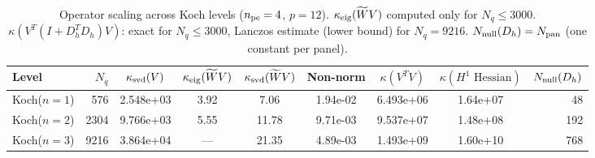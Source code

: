 \begin{table}[ht]
\centering
\caption{Operator scaling across Koch levels ($n_{\rm pe}=4$, $p=12$). $\kappa_{\rm eig}(\widetilde{W}V)$ computed only for $N_q\leq 3000$. $\kappa(V^T(I+D_h^TD_h)V)$: exact for $N_q\leq 3000$, Lanczos estimate (lower bound) for $N_q=9216$. $N_{\rm null}(D_h) = N_{\rm pan}$ (one constant per panel).}
\label{tab:operator_scaling}
\begin{tabular}{@{}lrccccccr@{}}
\toprule
Level & $N_q$ & $\kappa_{\rm svd}(V)$ & $\kappa_{\rm eig}(\widetilde{W}V)$ & $\kappa_{\rm svd}(\widetilde{W}V)$ & Non-norm & $\kappa(V^TV)$ & $\kappa(H^1\text{ Hessian})$ & $N_{\rm null}(D_h)$ \\
\midrule
  Koch($n=1$) & 576 & 2.548e+03 & 3.92 & 7.06 & 1.94e-02 & 6.493e+06 & 1.64e+07 & 48 \\
  Koch($n=2$) & 2304 & 9.766e+03 & 5.55 & 11.78 & 9.71e-03 & 9.537e+07 & 1.48e+08 & 192 \\
  Koch($n=3$) & 9216 & 3.864e+04 & — & 21.35 & 4.89e-03 & 1.493e+09 & 1.60e+10 & 768 \\
\bottomrule
\end{tabular}
\end{table}